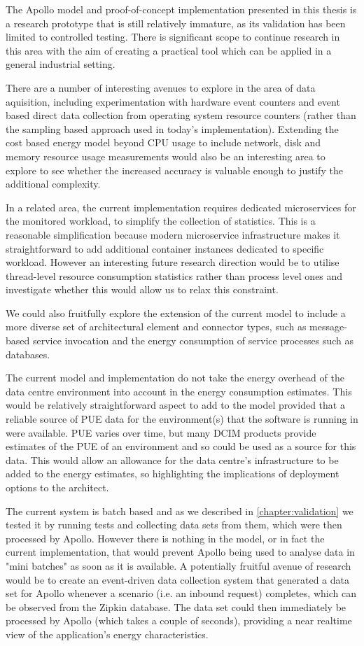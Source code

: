 The Apollo model and proof-of-concept implementation presented in this thesis is a research prototype that is still relatively immature, as its validation has been limited to controlled testing.  There is significant scope to continue research in this area with the aim of creating a practical tool which can be applied in a general industrial setting.

There are a number of interesting avenues to explore in the area of data aquisition, including experimentation with hardware event counters and event based direct data collection from operating system resource counters (rather than the sampling based approach used in today's implementation).  Extending the cost based energy model beyond CPU usage to include network, disk and memory resource usage measurements would also be an interesting area to explore to see whether the increased accuracy is valuable enough to justify the additional complexity.

In a related area, the current implementation requires dedicated microservices for the monitored workload, to simplify the collection of statistics.  This is a reasonable simplification because modern microservice infrastructure makes it straightforward to add additional container instances dedicated to specific workload.  However an interesting future research direction would be to utilise thread-level resource consumption statistics rather than process level ones and investigate whether this would allow us to relax this constraint.

We could also fruitfully explore the extension of the current model to include a more diverse set of architectural element and connector types, such as message-based service invocation and the energy consumption of service processes such as databases.

The current model and implementation do not take the energy overhead of the data centre environment into account in the energy consumption estimates.  This would be relatively straightforward aspect to add to the model provided that a reliable source of PUE data for the environment(s) that the software is running in were available.  PUE varies over time, but many DCIM products provide estimates of the PUE of an environment and so could be used as a source for this data.  This would allow an allowance for the data centre's infrastructure to be added to the energy estimates, so highlighting the implications of deployment options to the architect.

The current system is batch based and as we described in \cref{chapter:validation} we tested it by running tests and collecting data sets from them, which were then processed by Apollo.  However there is nothing in the model, or in fact the current implementation, that would prevent Apollo being used to analyse data in "mini batches" as soon as it is available.  A potentially fruitful avenue of research would be to create an event-driven data collection system that generated a data set for Apollo whenever a scenario (i.e. an inbound request) completes, which can be observed from the Zipkin database.  The data set could then immediately be processed by Apollo (which takes a couple of seconds), providing a near realtime view of the application's energy characteristics.

